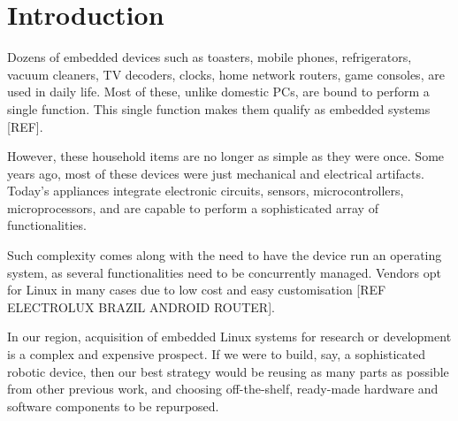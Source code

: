 \documentclass[conference]{IEEEtran}
\newcommand{\nota}[1]{}
\begin{document}
\section{Introduction}


\nota{
Existen decenas de dispositivos embebidos que utilizamos en la vida diaria.
Tostadoras, teléfonos móviles, heladeras, aspiradoras,
decodificadores de televisión, relojes, routers hogareños, consola de juegos, etc.
Y la mayoría de estos sistemas, a diferencia de una PC que puede
realizar miles de funciones diferentes, realizan una única función.
Esta única tarea define que nos encontramos ante sistemas embebidos \cite{steveheath}.
}
Dozens of embedded devices such as toasters, mobile phones, refrigerators, 
vacuum cleaners, TV decoders, clocks, home network routers, game consoles,  are used in daily life. Most of these, unlike domestic PCs, are bound to perform a single function. This single function makes them qualify as embedded systems [REF].


\nota{
Sin embargo, estos artículos del hogar ya no son tan simples como antes. Algunos
años atrás, la mayor parte de estos dispositivos fueron únicamente mecánicos
y eléctricos. En cambio, hoy en día, la mayoría incluye placas
de circuitos electrónicos, sensores, microcontroladores, microprocesadores y
funcionalidades sofisticadas.
}
However, these household items are no longer as simple as they were once. Some years ago,
most of these devices were just mechanical and electrical artifacts. Today's appliances
integrate electronic circuits, sensors, microcontrollers, microprocessors, 
and are capable to perform a sophisticated array of functionalities. 

\nota{
Esta complejidad trajo la necesidad de ejecutar un sistema operativo
dentro del dispositivo, ya
que se necesita administrar varias funcionalidades al mismo tiempo.
Actualmente, los fabricantes han optado por Linux en muchos
casos, debido principalmente a su
bajo costo y su gran adaptabilidad (referencia electrolux brasil, celular android, router linux)
}
Such complexity comes along with the need to have the device run an operating system, as several functionalities need to be concurrently managed. Vendors opt for Linux in many cases due to low cost and easy customisation [REF ELECTROLUX BRAZIL ANDROID ROUTER].

\nota{En el marco regional, adquirir sistemas Linux embebidos para investigación
o desarrollo es complejo y costoso.
Si fuese necesario, por ejemplo, construir un sofisticado dispositivo robótico
en nuestra realidad, reutilizaríamos, dentro de lo posible, la mayor cantidad de partes de otros
trabajos previos, como así también componentes de hardware y software
preexistentes, que puedan adaptarse cuando y donde se necesite.
}
In our region, acquisition of embedded Linux systems for research or development is a complex and expensive prospect. If we were to build, say, a sophisticated robotic device, then our best strategy would be reusing as many parts as possible from other previous work, and choosing off-the-shelf, ready-made hardware and software components to be repurposed.
\end{document}

